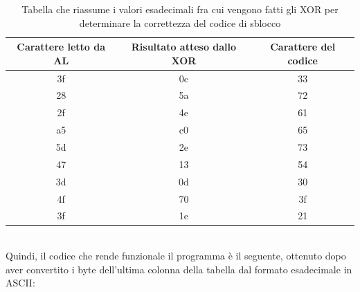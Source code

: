 \documentclass{article}
\begin{document}
\begin{table}[!hbtp]
\begin{tabular}{|c|c|c|}
\hline
\textbf{Carattere letto da AL} & \textbf{Risultato atteso dallo XOR} & \textbf{Carattere del codice}\\
\hline
3f & 0c & 33\\
\hline
28 & 5a & 72\\
\hline
2f & 4e & 61\\
\hline
a5 & c0 & 65\\
\hline
5d & 2e & 73\\
\hline
47 & 13 & 54\\
\hline
3d & 0d & 30\\
\hline
4f & 70 & 3f\\
\hline
3f & 1e & 21\\
\hline
\end{tabular}
\caption{Tabella che riassume i valori esadecimali fra cui vengono fatti gli XOR per determinare la correttezza del codice di sblocco}
\label{Tab1}
\end{table}
\\Quindi, il codice che rende funzionale il programma è il seguente, ottenuto dopo aver convertito i byte dell'ultima colonna della tabella dal formato esadecimale in ASCII:\\\\
\centerline{ 
%
}


\newpage
\end{document}
